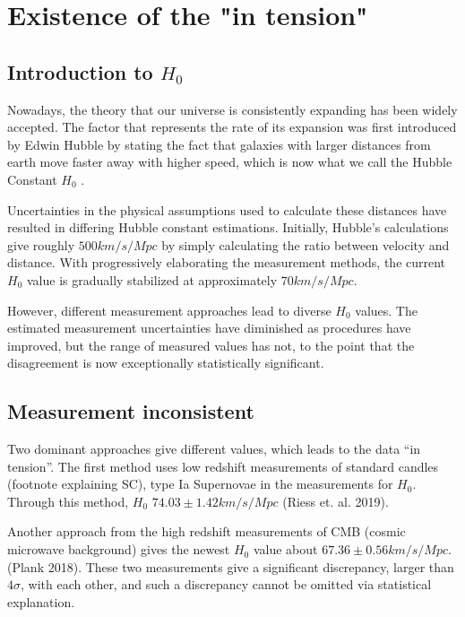 \section{Existence of the "in tension"} \label{sec:outline}
\subsection{\label{sec:level2}Introduction to $H_0$}
Nowadays, the theory that our universe is consistently expanding has been widely accepted. The factor that represents the rate of its expansion was first introduced by Edwin Hubble by stating the fact that galaxies with larger distances from earth move faster away with higher speed, which is now what we call the Hubble Constant $H_0$ \cite{Hubble_1929}. 

 Uncertainties in the physical assumptions used to calculate these distances have resulted in differing Hubble constant estimations. Initially, Hubble’s calculations give roughly $500 km/s/Mpc$ by simply calculating the ratio between velocity and distance\cite{Hubble_1929}. With progressively elaborating the measurement methods, the current $H_0$ value is gradually stabilized at approximately $70 km/s/Mpc$. 

However, different measurement approaches lead to diverse $H_0$ values. The estimated measurement uncertainties have diminished as procedures have improved, but the range of measured values has not, to the point that the disagreement is now exceptionally statistically significant.


\subsection{\label{sec:level2}Measurement inconsistent}
Two dominant approaches give different values, which leads to the data “in tension”. The first method uses low redshift measurements of standard candles (footnote explaining SC), type Ia Supernovae in the measurements for $H_0$. Through this method, $H_0$  $74.03 \pm 1.42 km/s/Mpc$  (Riess et. al. 2019).

Another approach from the high redshift measurements of CMB (cosmic microwave background) gives the newest $H_0$ value about $67.36 \pm 0.56km/s/Mpc$. (Plank 2018). These two measurements give a significant discrepancy, larger than $4 \sigma$, with each other, and such a discrepancy cannot be omitted via statistical explanation.


